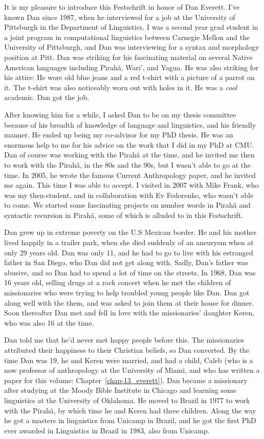 \begin{refsection}

It is my pleasure to introduce this Festschrift in honor of Dan Everett. I've known Dan since 1987, when he interviewed for a job at the University of Pittsburgh in the Department of Linguistics. I was a second year grad student in a joint program in computational linguistics between Carnegie Mellon and the University of Pittsburgh, and Dan was interviewing for a syntax and morphology position at Pitt. Dan was striking for his fascinating material on several Native American languages including Pirahã, Wari', and Yagua. He was also striking for his attire: He wore old blue jeans and a red t-shirt with a picture of a parrot on it.  The t-shirt was also noticeably worn out with holes in it. He was a \textit{cool} academic. Dan got the job. 

After knowing him for a while, I asked Dan to be on my thesis committee because of his breadth of knowledge of language and linguistics, and his friendly manner. He ended up being my co-advisor for my PhD thesis. He was an enormous help to me for his advice on the work that I did in my PhD at CMU. Dan of course was working with the Pirahã at the time, and he invited me then to work with the Pirahã, in the 80s and the 90s, but I wasn't able to go at the time. In 2005, he wrote the famous Current Anthropology paper, and he invited me again. This time I was able to accept. I visited in 2007 with Mike Frank, who was my then-student, and in collaboration with Ev Fedorenko, who wasn't able to come. We started some fascinating projects on number words in Pirahã and syntactic recursion in Pirahã, some of which is alluded to in this Festschrift. 

Dan grew up in extreme poverty on the U.S Mexican border. He and his mother lived happily in a trailer park, when she died suddenly of an aneurysm when at only 29 years old. Dan was only 11, and he had to go to live with his estranged father in San Diego, who Dan did not get along with. Sadly, Dan's father was abusive, and so Dan had to spend a lot of time on the streets. In 1968, Dan was 16 years old, selling drugs at a rock concert when he met the children of missionaries who were trying to help troubled young people like Dan. Dan got along well with the them, and was asked to join them at their house for dinner. Soon thereafter Dan met and fell in love with the missionaries' daughter Keren, who was also 16 at the time.

Dan told me that he'd never met happy people before this. The missionaries attributed their happiness to their Christian beliefs, so Dan converted. By the time Dan was 19, he and Keren were married, and had a child, Caleb (who is a now professor of anthropology at the University of Miami, and who has written a paper for this volume: Chapter~\ref{chap-13_everett}). Dan became a missionary after studying at the Moody Bible Institute in Chicago and learning some linguistics at the University of Oklahoma. He moved to Brazil in 1977 to work with the Pirahã, by which time he and Keren had three children. Along the way he got a masters in linguistics from Unicamp in Brazil, and he got the first PhD ever awarded in Linguistics in Brazil in 1983, also from Unicamp. 


\end{refsection}
